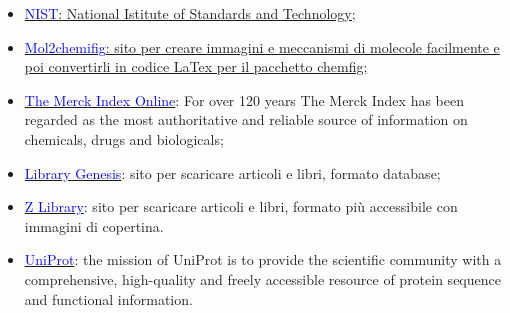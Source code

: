\begin{footnotesize}
\begin{multicols}{2}
\begin{itemize}
    \item \href{https://www.nist.gov/}{\textcolor{blue}{NIST}: National Istitute of Standards and Technology;}
    \item \href{https://py-chemist.com/mol_2_chemfig/home}{\textcolor{blue}{Mol2chemifig}: sito per creare immagini e meccanismi di molecole facilmente e poi convertirli in codice LaTex per il pacchetto chemfig;}
    \item \href{https://www.rsc.org/merck-index}{\textcolor{blue}{The Merck Index Online}}: For over 120 years The Merck Index has been regarded as the most authoritative and reliable source of information on chemicals, drugs and biologicals;
    \item \href{http://libgen.is/}{\textcolor{blue}{Library Genesis}}: sito per scaricare articoli e libri, formato database;
    \item \href{https://it.z-lib.org/}{\textcolor{blue}{Z Library}}: sito per scaricare articoli e libri, formato più accessibile con immagini di copertina.
    \item \href{https://www.uniprot.org/}{\textcolor{blue}{UniProt}}: the mission of UniProt is to provide the scientific community with a comprehensive, high-quality and freely accessible resource of protein sequence and functional information.
\end{itemize}
\end{multicols}
\end{footnotesize}